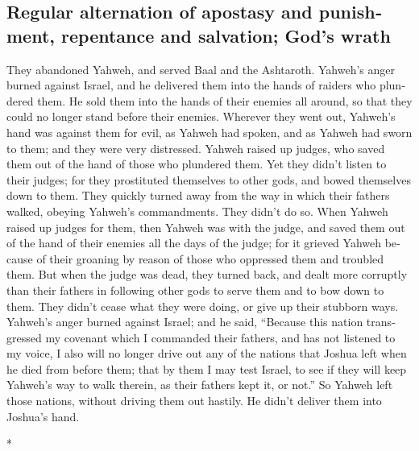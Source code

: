 \begin{paracol}{2}
\begin{otherlanguage}{english}
\hypertarget{regular-alternation-of-apostasy-and-punishment-repentance-and-salvation-gods-wrath}{%
\subsection{Regular alternation of apostasy and punishment, repentance
and salvation; God's
wrath}\label{regular-alternation-of-apostasy-and-punishment-repentance-and-salvation-gods-wrath}}

 They abandoned Yahweh, and served Baal and the
Ashtaroth.  Yahweh's anger burned against Israel, and he
delivered them into the hands of raiders who plundered them. He sold
them into the hands of their enemies all around, so that they could no
longer stand before their enemies.  Wherever they went
out, Yahweh's hand was against them for evil, as Yahweh had spoken, and
as Yahweh had sworn to them; and they were very distressed.
 Yahweh raised up judges, who saved them out of the hand
of those who plundered them.  Yet they didn't listen to
their judges; for they prostituted themselves to other gods, and bowed
themselves down to them. They quickly turned away from the way in which
their fathers walked, obeying Yahweh's commandments. They didn't do so.
 When Yahweh raised up judges for them, then Yahweh was
with the judge, and saved them out of the hand of their enemies all the
days of the judge; for it grieved Yahweh because of their groaning by
reason of those who oppressed them and troubled them. 
But when the judge was dead, they turned back, and dealt more corruptly
than their fathers in following other gods to serve them and to bow down
to them. They didn't cease what they were doing, or give up their
stubborn ways.  Yahweh's anger burned against Israel; and
he said, ``Because this nation transgressed my covenant which I
commanded their fathers, and has not listened to my voice,
 I also will no longer drive out any of the nations that
Joshua left when he died from before them;  that by them
I may test Israel, to see if they will keep Yahweh's way to walk
therein, as their fathers kept it, or not.''  So Yahweh
left those nations, without driving them out hastily. He didn't deliver
them into Joshua's hand.

\end{otherlanguage}

\switchcolumn[0]*

\hypertarget{indicaciuxf3n-de-los-pueblos-paganos-que-permanecieron-en-canauxe1n-cuyo-dios-usuxf3-a-los-israelitas-para-probar-y-guiar}{%
}
\end{paracol}
